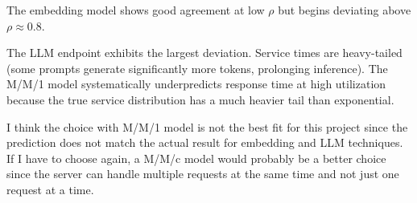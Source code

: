 \documentclass[
	english,
	accentcolor=9c,
	type=intern,
	marginpar=false,
	11pt
]{tudapub}
\begin{document}
The embedding model shows good agreement at low \(\rho\) but begins deviating above \(\rho \approx 0.8\).

The LLM endpoint exhibits the largest deviation. Service times are heavy-tailed (some prompts generate significantly more tokens, prolonging inference). The M/M/1 model systematically underpredicts response time at high utilization because the true service distribution has a much heavier tail than exponential.

I think the choice with M/M/1 model is not the best fit for this project since the prediction does not match the actual result for embedding and LLM techniques.
If I have to choose again, a M/M/c model would probably be a better choice since the server can handle multiple requests at the same time and not just one request at a time.



\end{document}
